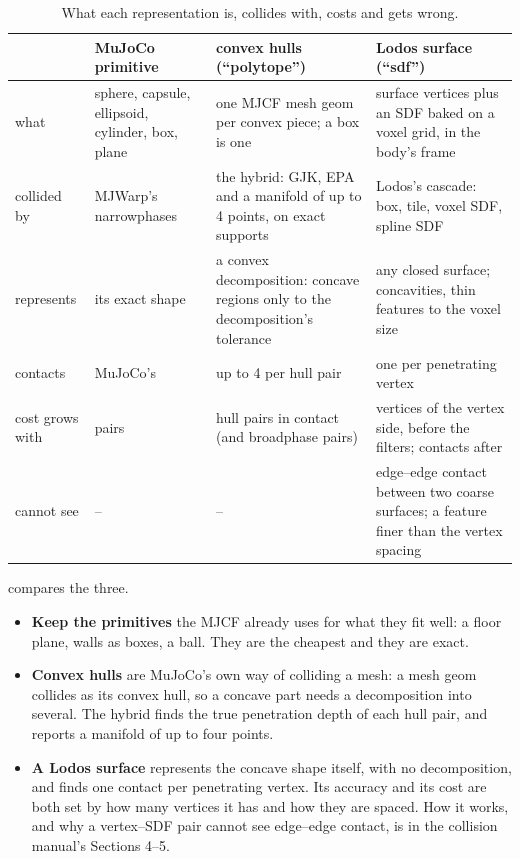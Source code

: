 \begin{table}[t]
\centering
\caption{What each representation is, collides with, costs and gets wrong.}
\label{tab:reps}
\small
\begin{tabularx}{\linewidth}{@{}L{19mm}YYY@{}}
\toprule
 & MuJoCo primitive & convex hulls (``polytope'') & Lodos surface (``sdf'') \\
\midrule
what & sphere, capsule, ellipsoid, cylinder, box, plane & one MJCF mesh geom per convex piece; a box is one & surface vertices plus an SDF baked on a voxel grid, in the body's frame \\
collided by & MJWarp's narrowphases & the hybrid: GJK, EPA and a manifold of up to 4 points, on exact supports & Lodos's cascade: box, tile, voxel SDF, spline SDF \\
represents & its exact shape & a convex decomposition: concave regions only to the decomposition's tolerance & any closed surface; concavities, thin features to the voxel size \\
contacts & MuJoCo's & up to 4 per hull pair & one per penetrating vertex \\
cost grows with & pairs & hull pairs in contact (and broadphase pairs) & vertices of the vertex side, before the filters; contacts after \\
cannot see & -- & -- & edge--edge contact between two coarse surfaces; a feature finer than the vertex spacing \\
\bottomrule
\end{tabularx}
\end{table}

 compares the three.

\begin{itemize}
\item \textbf{Keep the primitives} the MJCF already uses for what they fit well: a floor plane, walls as boxes, a ball. They are the cheapest and they are exact.
\item \textbf{Convex hulls} are MuJoCo's own way of colliding a mesh: a mesh geom collides as its convex hull, so a concave part needs a decomposition into several. The hybrid finds the true penetration depth of each hull pair, and reports a manifold of up to four points.
\item \textbf{A Lodos surface} represents the concave shape itself, with no decomposition, and finds one contact per penetrating vertex. Its accuracy and its cost are both set by how many vertices it has and how they are spaced. How it works, and why a vertex--SDF pair cannot see edge--edge contact, is in the collision manual's Sections 4--5.
\end{itemize}

